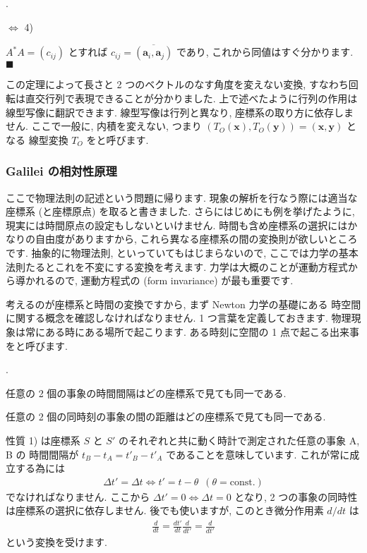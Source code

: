 \documentclass[openany, a4paper, oneside]{book}
\newcounter{enum2}
\renewenvironment{enumerate}{%
\begin{list}%
{%
\arabic{enum2}.\ \,%
}%
{%
\usecounter{enum2}
\setlength{\itemindent}{0pt}%
\setlength{\leftmargin}{6pt}%
\setlength{\rightmargin}{0pt}%
\setlength{\labelsep}{0pt}%
\setlength{\labelwidth}{6pt}%
\setlength{\itemsep}{0pt}%
\setlength{\parsep}{0pt}%
\setlength{\listparindent}{0pt}%
}
}{%
\end{list}%
}
\theoremstyle{break}
\theoremstyle{breakdefn}
\newcommand{\bs}{\blacksquare}
\begin{document}
\begin{enumerate}
\item $\Leftrightarrow$ 4)
\end{enumerate}
$A^*A=(c_{ij})$ とすれば $c_{ij}=\overline{(\bm{a}_i,\bm{a}_j)}$ であり,
これから同値はすぐ分かります.  $\bs$

この定理によって長さと 2 つのベクトルのなす角度を変えない変換,
すなわち回転は直交行列で表現できることが分かりました.
上で述べたように行列の作用は線型写像に翻訳できます.
線型写像は行列と異なり, 座標系の取り方に依存しません.
ここで一般に, 内積を変えない, つまり
$( T_O ( \bm{x} ) , T_O ( \bm{y} ) ) = ( \bm{x} , \bm{y} )$ となる
線型変換  $T_O$  をと呼びます.
\subsubsection{Galilei の相対性原理}
\label{sec-4-3-2-3-4}

ここで物理法則の記述という問題に帰ります.
現象の解析を行なう際には適当な座標系 (と座標原点) を取ると書きました.
さらにはじめにも例を挙げたように, 現実には時間原点の設定もしないといけません.
時間も含め座標系の選択にはかなりの自由度がありますから, これら異なる座標系の間の変換則が欲しいところです.
抽象的に物理法則, といっていてもはじまらないので,
ここでは力学の基本法則たるとこれを不変にする変換を考えます.
力学は大概のことが運動方程式から導かれるので, 運動方程式の
(form invariance) が最も重要です.

考えるのが座標系と時間の変換ですから, まず Newton 力学の基礎にある
時空間に関する概念を確認しなければなりません.
1 つ言葉を定義しておきます.
物理現象は常にある時にある場所で起こります.
ある時刻に空間の 1 点で起こる出来事をと呼びます.
\begin{enumerate}
    \item[1)] 任意の 2 個の事象の時間間隔はどの座標系で見ても同一である.
    \item[2)] 任意の 2 個の同時刻の事象の間の距離はどの座標系で見ても同一である.
\end{enumerate}
性質 1) は座標系 $S$ と $S'$ のそれぞれと共に動く時計で測定された任意の事象 A, B の
時間間隔が $t_B - t_A = t'_B - t'_A$ であることを意味しています.
これが常に成立する為には
    \begin{gather}
        \varDelta t'
        =
        \varDelta t
        \Longleftrightarrow
        t'
        =
        t - \theta \,\,\, ( \theta = \mathrm{const.} )
    \end{gather}
でなければなりません.
ここから $\varDelta t' = 0 \Leftrightarrow \varDelta t =0$ となり,
2 つの事象の同時性は座標系の選択に依存しません.
後でも使いますが, このとき微分作用素 $d/dt$ は
    \begin{gather}
        \frac{d} {dt}
        =
        \frac{dt'} {dt} \frac{d} {dt'}
        =
        \frac{d} {dt'}
    \end{gather}
という変換を受けます.
\end{document}
